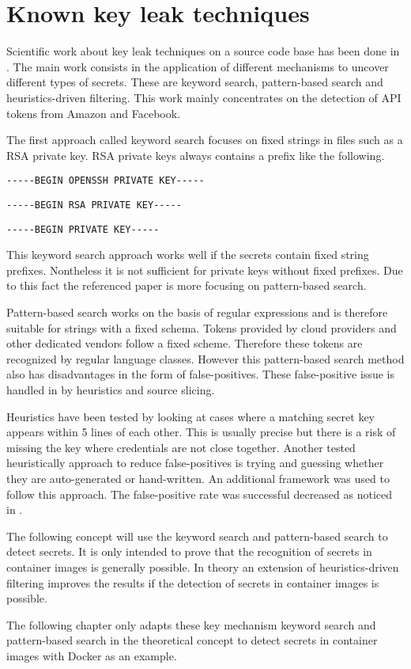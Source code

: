 %
%

\chapter{Known key leak techniques}
\label{ch:known_key_leak_techniques}
Scientific work about key leak techniques on a source code base has been done in \cite{7180102}. 
The main work consists in the application of different mechanisms to uncover different types of secrets.
These are keyword search, pattern-based search and heuristics-driven filtering.
This work mainly concentrates on the detection of API tokens from Amazon and Facebook.
	
The first approach called keyword search focuses on fixed strings in files such as a RSA private key. 
RSA private keys always contains a prefix like the following.
\begin{lstlisting}
-----BEGIN OPENSSH PRIVATE KEY-----
\end{lstlisting}
\begin{lstlisting}
-----BEGIN RSA PRIVATE KEY-----
\end{lstlisting}
\begin{lstlisting}
-----BEGIN PRIVATE KEY-----
\end{lstlisting}
This keyword search approach works well if the secrets contain fixed string prefixes. 
Nontheless it is not sufficient for private keys without fixed prefixes.
Due to this fact the referenced paper \cite{7180102} is more focusing on pattern-based search. 

Pattern-based search works on the basis of regular expressions and is therefore suitable for strings with a fixed schema.
Tokens provided by cloud providers and other dedicated vendors follow a fixed scheme. Therefore these tokens are recognized by regular language classes.
However this pattern-based search method also has disadvantages in the form of false-positives.
These false-positive issue is handled in \cite{7180102} by heuristics and source slicing.

Heuristics have been tested by looking at cases where a matching secret key appears within 5 lines of each other. 
This is usually precise but there is a risk of missing the key where credentials are not close together.
Another tested heuristically approach to reduce false-positives is trying and guessing whether they are auto-generated or hand-written. 
An additional framework was used to follow this approach. 
The false-positive rate was successful decreased as noticed in \cite{7180102}.

The following concept will use the keyword search and pattern-based search to detect secrets. 
It is only intended to prove that the recognition of secrets in container images is generally possible. 
In theory an extension of heuristics-driven filtering improves the results if the detection of secrets in container images is possible.

The following chapter only adapts these key mechanism keyword search and pattern-based search in the theoretical concept to detect secrets in container images with Docker as an example.